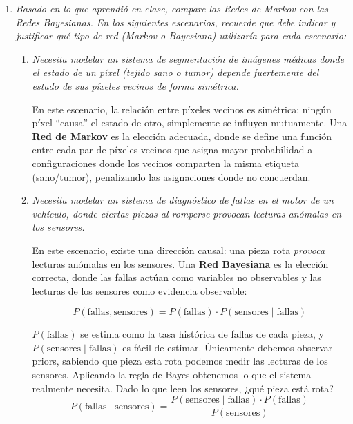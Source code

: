 \documentclass[11pt]{article}
\begin{document}
\begin{enumerate}
  Así, en producción se estima la dirección fácil $P(B \mid A)$ a partir de datos históricos, 
  se incorpora el prior $P(A)$ como la tasa base de fraude, y se obtiene la probabilidad 
  diagnóstica $P(A \mid B)$ que el sistema realmente necesita.


  \item \textit{Basado en lo que aprendió en clase, compare las Redes de Markov con las Redes Bayesianas. En los siguientes escenarios,
    recuerde que debe indicar y justificar qué tipo de red (Markov o Bayesiana) utilizaría para cada escenario:}

\begin{enumerate}
  \item \textit{Necesita modelar un sistema de segmentación de imágenes médicas donde el estado de un
  píxel (tejido sano o tumor) depende fuertemente del estado de sus píxeles vecinos de forma
  simétrica.}
  
  En este escenario, la relación entre píxeles vecinos es simétrica:
  ningún píxel ``causa'' el estado de otro, simplemente se influyen mutuamente. 
  Una \textbf{Red de Markov} es la elección adecuada, donde se define una función 
  entre cada par de píxeles vecinos que asigna mayor probabilidad a 
  configuraciones donde los vecinos comparten la misma etiqueta (sano/tumor), penalizando 
  las asignaciones donde no concuerdan.

  \item \textit{Necesita modelar un sistema de diagnóstico de fallas en el motor de un vehículo, donde
  ciertas piezas al romperse provocan lecturas anómalas en los sensores.}
  
  En este escenario, existe una dirección causal: una pieza rota 
  \textit{provoca} lecturas anómalas en los sensores. Una \textbf{Red Bayesiana} 
  es la elección correcta, donde las fallas actúan como variables no observables 
  y las lecturas de los sensores como evidencia observable:

  $$P(\text{fallas}, \text{sensores}) = P(\text{fallas}) \cdot P(\text{sensores} \mid \text{fallas})$$

  $P(\text{fallas})$ se estima como la tasa histórica de fallas de cada pieza, y 
  $P(\text{sensores} \mid \text{fallas})$ es fácil de estimar. Únicamente debemos observar priors, sabiendo
  que pieza esta rota podemos medir las lecturas de los sensores. Aplicando la regla de Bayes obtenemos 
  lo que el sistema realmente necesita. Dado lo que leen los sensores, ¿qué pieza está rota?
  $$P(\text{fallas} \mid \text{sensores}) = \frac{P(\text{sensores} \mid \text{fallas}) \cdot P(\text{fallas})}{P(\text{sensores})}$$
\end{enumerate}


\end{enumerate}
\end{document}
